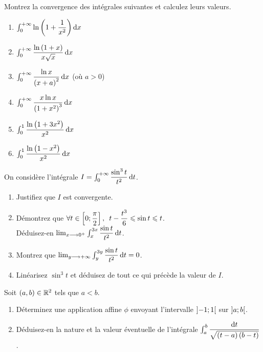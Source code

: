 \begin{exoss}
Montrez la convergence des intégrales suivantes et calculez leurs valeurs.

\begin{enumerate}
    \item \(\int_0^{\pinf}\ln\paren{1+\dfrac{1}{x^2}}\odif{x}\) \\
    \item \(\int_0^{\pinf}\dfrac{\ln\paren{1+x}}{x\sqrt{x}}\odif{x}\) \\
    \item \(\int_0^{\pinf}\dfrac{\ln x}{\paren{x+a}^2}\odif{x}\) (où \(a>0\)) \\
    \item \(\int_0^{\pinf}\dfrac{x\ln x}{\paren{1+x^2}^3}\odif{x}\) \\
    \item \(\int_0^1\dfrac{\ln\paren{1+3x^2}}{x^2}\odif{x}\) \\
    \item \(\int_0^1\dfrac{\ln\paren{1-x^2}}{x^2}\odif{x}\)
\end{enumerate}
\end{exoss}

\begin{exoss}
On considère l'intégrale \(I=\int_0^{\pinf}\dfrac{\sin^3t}{t^2}\odif{t}\).

\begin{enumerate}
    \item Justifiez que \(I\) est convergente. \\
    \item Démontrez que \(\quantifs{\forall t\in\intervii{0}{\dfrac{\pi}{2}}}t-\dfrac{t^3}{6}\leq\sin t\leq t\). \\ Déduisez-en \(\lim_{x\to0^+}\int_x^{3x}\dfrac{\sin t}{t^2}\odif{t}\). \\
    \item Montrez que \(\lim_{y\to\pinf}\int_y^{3y}\dfrac{\sin t}{t^2}\odif{t}=0\). \\
    \item Linéarisez \(\sin^3t\) et déduisez de tout ce qui précède la valeur de \(I\).
\end{enumerate}
\end{exoss}

\begin{exos}
Soit \(\left(a,b\right)\in\mathbb{R}^2\) tels que \(a<b\).

\begin{enumerate}
    \item Déterminez une application affine \(\phi\) envoyant l'intervalle \(\left]-1;1\right[\) sur \(\left]a;b\right[\). \\
    \item Déduisez-en la nature et la valeur éventuelle de l'intégrale \(\int_a^b\dfrac{\odif{t}}{\sqrt{\paren{t-a}\paren{b-t}}}\).
\end{enumerate}
\end{exos}

